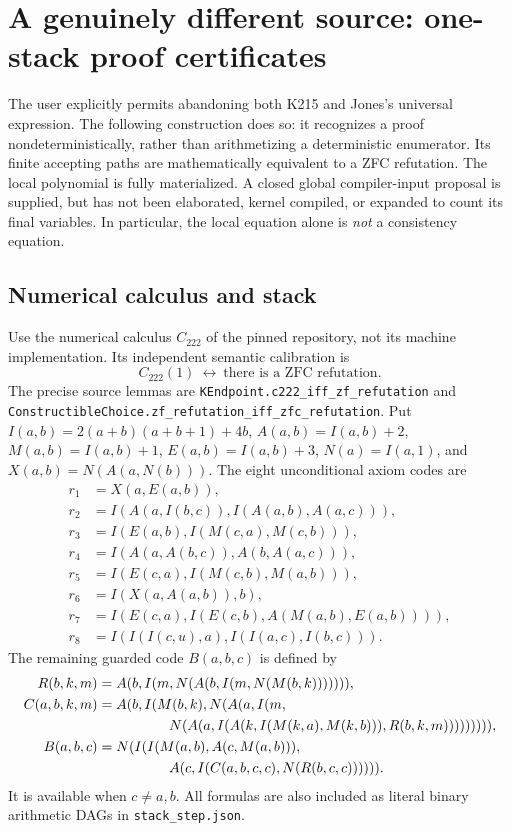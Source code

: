 \section{A genuinely different source: one-stack proof certificates}
\label{sec:onestack}
The user explicitly permits abandoning both K215 and Jones's universal
expression. The following construction does so: it recognizes a proof
nondeterministically, rather than arithmetizing a deterministic enumerator.
Its finite accepting paths are mathematically equivalent to a ZFC refutation.
The local polynomial is fully materialized. A closed global compiler-input
proposal is supplied, but has not been elaborated, kernel compiled, or
expanded to count its final variables. In particular, the local equation
alone is \emph{not} a consistency equation.

\subsection{Numerical calculus and stack}
Use the numerical calculus $C_{222}$ of the pinned repository, not its machine
implementation. Its independent semantic calibration is
\[
 C_{222}(1)\ \longleftrightarrow\ \text{there is a ZFC refutation}.
\]
The precise source lemmas are
\texttt{KEndpoint.c222\_iff\_zf\_refutation} and
\texttt{ConstructibleChoice.zf\_refutation\_iff\_zfc\_refutation}.
Put $I(a,b)=2(a+b)(a+b+1)+4b$, $A(a,b)=I(a,b)+2$,
$M(a,b)=I(a,b)+1$, $E(a,b)=I(a,b)+3$, $N(a)=I(a,1)$, and
$X(a,b)=N(A(a,N(b)))$.
The eight unconditional axiom codes are
\begin{align*}
 r_1&=X(a,E(a,b)),\\
 r_2&=I(A(a,I(b,c)),I(A(a,b),A(a,c))),\\
 r_3&=I(E(a,b),I(M(c,a),M(c,b))),\\
 r_4&=I(A(a,A(b,c)),A(b,A(a,c))),\\
 r_5&=I(E(c,a),I(M(c,b),M(a,b))),\\
 r_6&=I(X(a,A(a,b)),b),\\
 r_7&=I(E(c,a),I(E(c,b),A(M(a,b),E(a,b)))),\\
 r_8&=I(I(I(c,u),a),I(I(a,c),I(b,c))).
\end{align*}
The remaining guarded code $B(a,b,c)$ is defined by
\begin{align*}
 R(b,k,m)&=A(b,I(m,N(A(b,I(m,N(M(b,k))))))),\\
 C(a,b,k,m)&=A(b,I(M(b,k),N(A(a,I(m,\\
 &\hspace{18mm}N(A(a,I(A(k,I(M(k,a),M(k,b))),R(b,k,m))))))))),\\
 B(a,b,c)&=N(I(I(M(a,b),A(c,M(a,b))),\\
 &\hspace{18mm}A(c,I(C(a,b,c,c),N(R(b,c,c)))))).
\end{align*}
It is available when $c\ne a,b$. All formulas are also included as literal
binary arithmetic DAGs in \texttt{stack\_step.json}.

